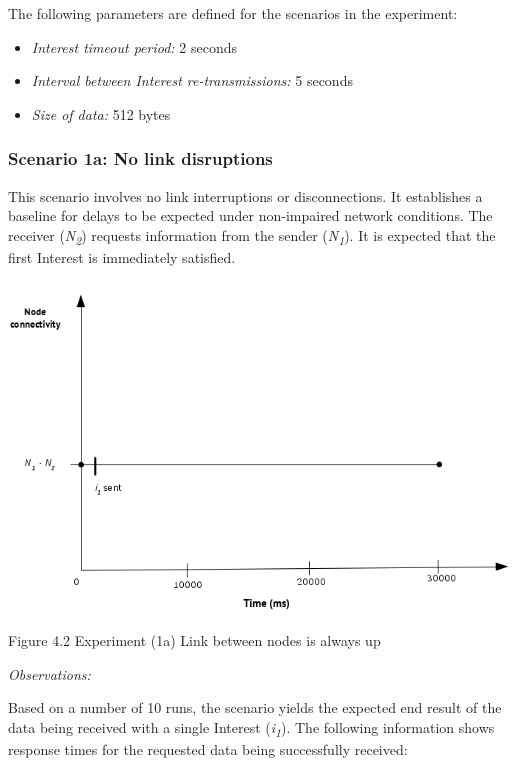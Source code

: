 \documentclass[a4paper,12pt]{report}      %
\begin{document}
\noindent The following parameters are defined for the scenarios in the experiment:
\begin{itemize}
\item \textsl{Interest timeout period:}  2 seconds
\item \textsl{Interval between Interest re-transmissions:} 5 seconds
\item \textsl{Size of data:} 512 bytes
\end{itemize}

\subsubsection{Scenario 1a: No link disruptions}

This scenario involves no link interruptions or disconnections. It establishes a baseline for delays to be expected under non-impaired network conditions. The receiver (\emph{N\textsubscript{2}}) requests information from the sender (\emph{N\textsubscript{1}}). It is expected that the first Interest is immediately satisfied.

\noindent\includegraphics[scale=0.55]{exp1a_timediag.jpg}\newline
\begin{center}Figure 4.2 Experiment (1a) Link between nodes is always up\end{center}

\vspace*{1\baselineskip}\noindent\emph{Observations:}

Based on a number of 10 runs, the scenario yields the expected end result of the data being received
with a single Interest (\emph{i\textsubscript{1}}). The following information shows response times for the requested
data being successfully received:
\end{document}
